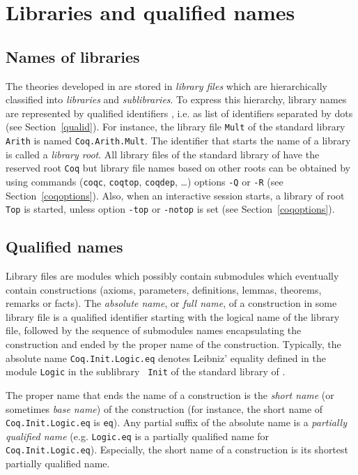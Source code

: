 \section{Libraries and qualified names}

\subsection{Names of libraries
\label{Libraries}
}

The theories developed in {\Coq} are stored in {\em library files}
which are hierarchically classified into {\em libraries} and {\em
  sublibraries}. To express this hierarchy, library names are
represented by qualified identifiers {\qualid}, i.e. as list of
identifiers separated by dots (see Section~\ref{qualid}). For
instance, the library file {\tt Mult} of the standard {\Coq} library
{\tt Arith} is named {\tt Coq.Arith.Mult}. The identifier that starts
the name of a library is called a {\em library root}.  All library
files of the standard library of {\Coq} have the reserved root {\tt Coq}
but library file names based on other roots can be obtained by using
{\Coq} commands ({\tt coqc}, {\tt coqtop}, {\tt coqdep}, \dots) options
{\tt -Q} or {\tt -R} (see Section~\ref{coqoptions}). Also, when an
interactive {\Coq} session starts, a library of root {\tt Top} is
started, unless option {\tt -top} or {\tt -notop} is set (see
Section~\ref{coqoptions}).

\subsection{Qualified names
\label{LongNames}
}

Library files are modules which possibly contain submodules which
eventually contain constructions (axioms, parameters, definitions,
lemmas, theorems, remarks or facts). The {\em absolute name}, or {\em
full name}, of a construction in some library file is a qualified
identifier starting with the logical name of the library file,
followed by the sequence of submodules names encapsulating the
construction and ended by the proper name of the construction.
Typically, the absolute name {\tt Coq.Init.Logic.eq} denotes Leibniz'
equality defined in the module {\tt Logic} in the sublibrary {\tt
Init} of the standard library of \Coq.

The proper name that ends the name of a construction is the {\it short
name} (or sometimes {\it base name}) of the construction (for
instance, the short name of {\tt Coq.Init.Logic.eq} is {\tt eq}). Any
partial suffix of the absolute name is a {\em partially qualified name}
(e.g. {\tt Logic.eq} is a partially qualified name for {\tt
Coq.Init.Logic.eq}).  Especially, the short name of a construction is
its shortest partially qualified name.

